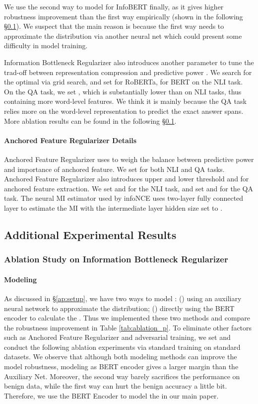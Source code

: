 \documentclass{article} \usepackage{iclr2021_conference,times}
\theoremstyle{definition}
\theoremstyle{remark}
\newcommand{\method}{InfoBERT\xspace}
\begin{document}
We use the second way to model  for \method finally, as it gives higher robustness improvement than the first way empirically (shown in the following \S\ref{ap:exp}). We suspect that the main reason is because the first way needs to approximate the distribution  via another neural net which could present some difficulty in model training. 

Information Bottleneck Regularizer also introduces another parameter  to tune the trad-off between representation compression  and predictive power . We search for the optimal  via grid search, and set  for RoBERTa,  for BERT on the NLI task. On the QA task, we set , which is substantially lower than  on NLI tasks, thus containing more word-level features. We think it is mainly because the QA task relies more on the word-level representation to predict the exact answer spans. More ablation results can be found in the following \S\ref{ap:exp}.

\paragraph{Anchored Feature Regularizer Details} Anchored Feature Regularizer uses  to weigh the balance between predictive power and importance of anchored feature. We set  for both NLI and QA tasks. Anchored Feature Regularizer also introduces upper and lower threshold  and  for anchored feature extraction. We set  and  for the NLI task, and set  and  for the QA task. The neural MI estimator used by infoNCE uses two-layer fully connected layer to estimate the MI with the intermediate layer hidden size set to .









\subsection{Additional Experimental Results} \label{ap:exp}
\subsubsection{Ablation Study on Information Bottleneck Regularizer}
\paragraph{Modeling } As discussed in \S\ref{ap:setup}, we have two ways to model : () using an auxiliary neural network to approximate the distribution; () directly using the BERT encoder  to calculate the . Thus we implemented these two methods and compare the robustness improvement in Table \ref{tab:ablation_p}.  To eliminate other factors such as Anchored Feature Regularizer and adversarial training, we set  and conduct the following ablation experiments via standard training on standard datasets. We observe that although both modeling methods can improve the model robustness, modeling as BERT encoder gives a larger margin than the Auxiliary Net. Moreover, the second way barely sacrifices the performance on benign data, while the first way can hurt the benign accuracy a little bit. Therefore, we use the BERT Encoder  to model the  in our main paper.
\end{document}
